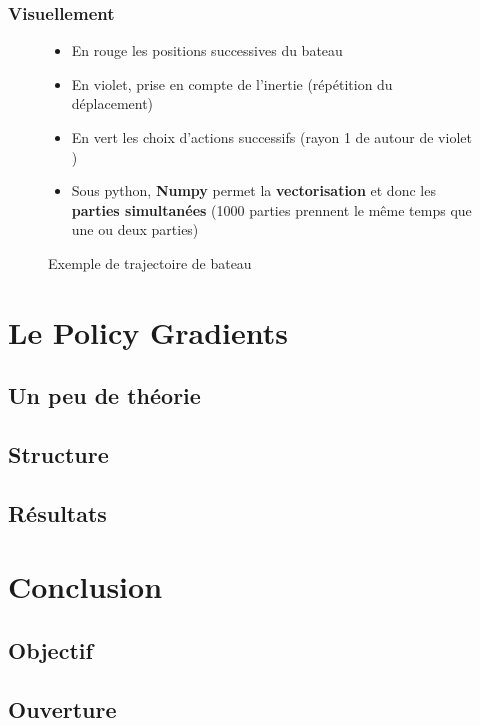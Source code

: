 \documentclass[8pt]{beamer}
\begin{document}
\begin{frame}

  \frametitle{Visuellement}

  \begin{figure}
    \begin{minipage}[c]{.46\linewidth}
      \centering
      
      \caption{Exemple de trajectoire de bateau}
    \end{minipage}
    \hfill%
    \begin{minipage}[c]{.46\linewidth}
      \centering
      \begin{itemize}
      \item En {\color{red} rouge} les positions successives du bateau
      \item En {\color{purple} violet}, prise en compte de l'inertie (répétition du déplacement)
      \item En {\color{lime} vert} les choix d'actions successifs (rayon 1 de autour de {\color{purple}violet} \footnotemark)
      \item Sous python, \textbf{Numpy} permet la \textbf{vectorisation} et donc les \textbf{parties simultanées} (1000 parties prennent le même temps que une ou deux parties)
      \end{itemize}
    \end{minipage}
  \end{figure}

\end{frame}


\section{Le Policy Gradients}

\subsection{Un peu de théorie}

\subsection{Structure}

\subsection{Résultats}


\section*{Conclusion}

\subsection{Objectif}

\subsection{Ouverture}
\end{document}
